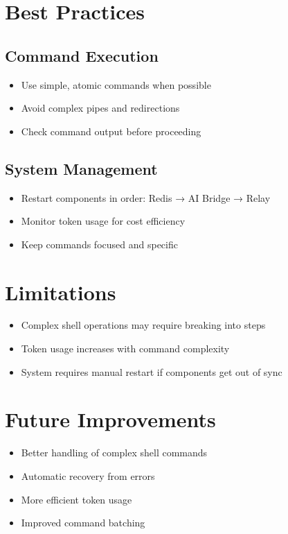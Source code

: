 \documentclass{article}
\begin{document}
\section{Best Practices}

\subsection{Command Execution}
\begin{itemize}
    \item Use simple, atomic commands when possible
    \item Avoid complex pipes and redirections
    \item Check command output before proceeding
\end{itemize}

\subsection{System Management}
\begin{itemize}
    \item Restart components in order: Redis → AI Bridge → Relay
    \item Monitor token usage for cost efficiency
    \item Keep commands focused and specific
\end{itemize}

\section{Limitations}
\begin{itemize}
    \item Complex shell operations may require breaking into steps
    \item Token usage increases with command complexity
    \item System requires manual restart if components get out of sync
\end{itemize}

\section{Future Improvements}
\begin{itemize}
    \item Better handling of complex shell commands
    \item Automatic recovery from errors
    \item More efficient token usage
    \item Improved command batching
\end{itemize}
\end{document}
